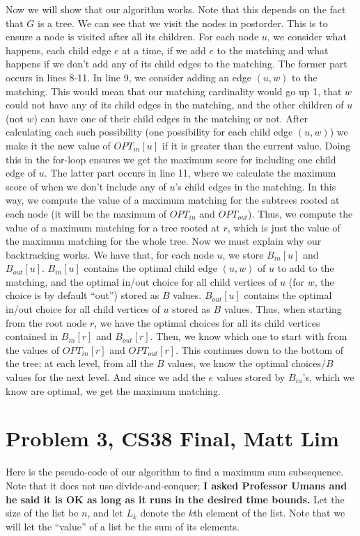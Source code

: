 \documentclass{article}
\begin{document}
Now we will show that our algorithm works. Note that this depends on the fact
that $G$ is a tree. We can see that we visit the nodes in
postorder. This is to ensure a node is visited after all its children. For each
node $u$, we consider what happens, each child edge $e$ at a time, if we add
$e$ to the matching and what happens if we don't add any of its child
edges to the matching. The former part occurs in lines 8-11. In line 9, we
consider adding an edge $(u,w)$ to the matching. This would mean that our matching
cardinality would go up 1, that $w$ could not have any of its child edges in the
matching, and the other children of $u$ (not $w$) can have one of their child
edges in the matching or not. After calculating each such possibility (one
possibility for each child edge $(u,w)$) we make it the new value of
$OPT_{in}[u]$ if it is greater than the current value. Doing this in the
for-loop ensures we get the maximum score for including one child edge of $u$.
The latter part occurs in line 11, where we calculate the maximum score of when
we don't include any of $u$'s child edges in the matching. In this way, we
compute the value of a maximum matching for the subtrees rooted at each node (it
will be the maximum of $OPT_{in}$ and $OPT_{out}$).
Thus, we compute the value of a maximum matching for a tree rooted at $r$, which
is just the value of the maximum matching for the whole tree. Now we must
explain why our backtracking works. We have that, for each node $u$, we store
$B_{in}[u]$ and $B_{out}[u]$. $B_{in}[u]$ contains the optimal child edge
$(u,w)$ of $u$ to add to the matching, and the optimal in/out choice for all child vertices of
$u$ (for $w$, the choice is by default ``out'') stored as $B$ values. $B_{out}[u]$ contains the
optimal in/out choice for all child vertices of $u$ stored as $B$ values. Thus, when starting from the
root node $r$, we have the optimal choices for all its child vertices contained
in $B_{in}[r]$ and $B_{out}[r]$. Then, we know which one to start with from the values
of $OPT_{in}[r]$ and $OPT_{out}[r]$. This continues down to the bottom of the
tree; at each level, from all the $B$ values, we know the optimal choices/$B$
values for the next level. And since we add the $e$ values stored by $B_{in}$'s,
which we know are optimal, we get the maximum matching.
\newpage

\section*{Problem 3, CS38 Final, Matt Lim}
Here is the pseudo-code of our algorithm to find a maximum sum subsequence. Note
that it does not use divide-and-conquer; \textbf{I asked Professor Umans and he said it
is OK as long as it runs in the desired time bounds.} Let the size of the
list be $n$, and let $L_k$ denote the $k$th element of the list.
Note that we will let the ``value'' of a list be the sum of its elements.
\end{document}
